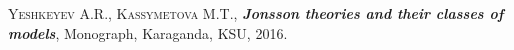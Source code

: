 \documentclass[bsl,meeting]{asl}
\begin{document}
\begin{thebibliography}{10}




{\scshape Yeshkeyev A.R., Kassymetova M.T.},
{\bfseries\itshape Jonsson theories and their classes of models},
Monograph,
Karaganda,
KSU,
2016.
\end{thebibliography}

\vspace*{-0.5\baselineskip}
\end{document}
